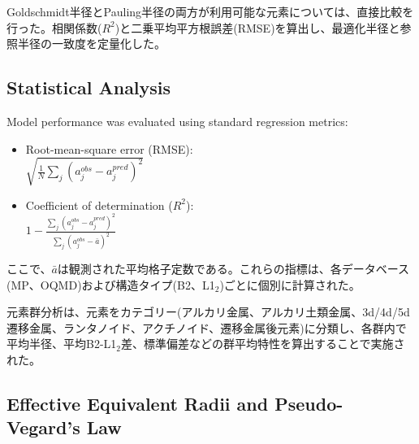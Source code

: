 \documentclass[a4paper,10pt,5p]{elsarticle}
\begin{document}
Goldschmidt半径とPauling半径の両方が利用可能な元素については、直接比較を行った。相関係数($R^2$)と二乗平均平方根誤差(RMSE)を算出し、最適化半径と参照半径の一致度を定量化した。


\subsection{Statistical Analysis}

Model performance was evaluated using standard regression metrics:
\begin{itemize}
\setlength{\parskip}{0cm} %
\setlength{\itemsep}{0cm} %
    \item Root-mean-square error (RMSE): \\$\sqrt{\frac{1}{N}\sum_j(a_j^{obs} - a_j^{pred})^2}$
    \item Coefficient of determination ($R^2$): \\$1 - \frac{\sum_j(a_j^{obs} - a_j^{pred})^2}{\sum_j(a_j^{obs} - \bar{a})^2}$
\end{itemize}

ここで、$\bar{a}$は観測された平均格子定数である。これらの指標は、各データベース(MP、OQMD)および構造タイプ(B2、L1$_2$)ごとに個別に計算された。

元素群分析は、元素をカテゴリー(アルカリ金属、アルカリ土類金属、3d/4d/5d遷移金属、ランタノイド、アクチノイド、遷移金属後元素)に分類し、各群内で平均半径、平均B2-L1$_2$差、標準偏差などの群平均特性を算出することで実施された。



\subsection{Effective Equivalent Radii and Pseudo-Vegard's Law}
\end{document}
